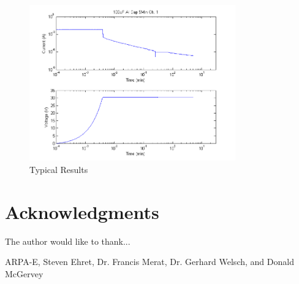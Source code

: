 \documentclass[journal]{IEEEtran}
\begin{document}
                        \begin{figure}[here]
                        \centering
                        \includegraphics[width=3.5in]{measData}
                        \caption{Typical Results}
                        \label{fig:measData}
                        \end{figure}

                        \section*{Acknowledgments}

                        The author would like to thank...

                        ARPA-E,
                        Steven Ehret,
                        Dr. Francis Merat,
                        Dr. Gerhard Welsch,
                        and Donald McGervey

                        \ifCLASSOPTIONcaptionsoff
                        \newpage
                        \fi
\end{document}
